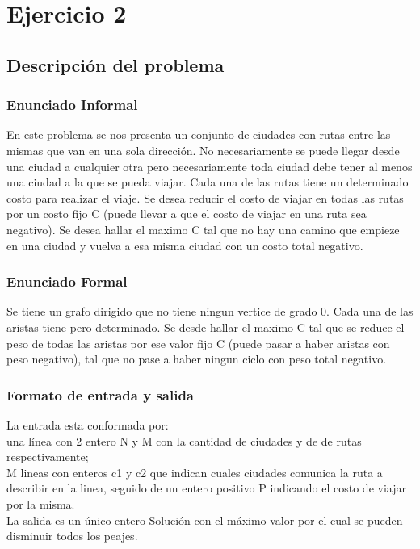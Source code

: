 \section{Ejercicio 2}

\subsection{Descripción del problema}

\subsubsection{Enunciado Informal}

En este problema se nos presenta un conjunto de ciudades con rutas entre las mismas que van en una sola dirección. No necesariamente se puede llegar desde una ciudad a cualquier otra pero necesariamente toda ciudad debe tener al menos una ciudad a la que se pueda viajar.
Cada una de las rutas tiene un determinado costo para realizar el viaje. Se desea reducir el costo de viajar en todas las rutas por un costo fijo C (puede llevar a que el costo de viajar en una ruta sea negativo). Se desea hallar el maximo C tal que no hay una camino que empieze en una ciudad y vuelva a esa misma ciudad con un costo total negativo.  

\subsubsection{Enunciado Formal}

Se tiene un grafo dirigido que no tiene ningun vertice de grado 0. Cada una de las aristas tiene pero determinado. Se desde hallar el maximo C tal que se reduce el peso de todas las aristas por ese valor fijo C (puede pasar a haber aristas con peso negativo), tal que no pase a haber ningun ciclo con peso total negativo.

\subsubsection{Formato de entrada y salida}
La entrada esta conformada por:\\
una línea con 2 entero N  y M con la cantidad de ciudades y de de rutas respectivamente;\\
M lineas con enteros c1 y c2 que indican cuales ciudades comunica la ruta a describir en la linea, seguido de un entero positivo P indicando el costo de viajar por la misma.
\\
La salida es un único entero Solución con el máximo valor por el cual se pueden disminuir todos los peajes.

